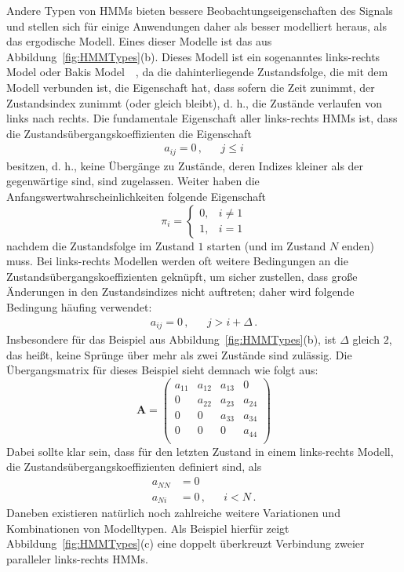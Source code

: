 Andere Typen von \acrshort{HMM}s bieten bessere Beobachtungseigenschaften des Signals und stellen sich f\"ur einige Anwendungen daher als besser modelliert heraus, als das ergodische Modell. Eines dieser Modelle ist das aus  Abbildung~\ref{fig:HMMTypes}(b). Dieses Modell ist ein sogenanntes links-rechts Model oder Bakis Model~\cite{bib:jelinek}~\cite{bib:bakis}, da die dahinterliegende Zustandsfolge, die mit dem Modell verbunden ist, die Eigenschaft hat, dass sofern die Zeit zunimmt, der Zustandsindex zunimmt (oder gleich bleibt), d. h., die Zust\"ande verlaufen von links nach rechts. Die fundamentale Eigenschaft aller links-rechts HMMs ist, dass die Zustands\"ubergangskoeffizienten die Eigenschaft
\begin{align}
a_{ij} = 0 \, , & & j \leq i
\end{align}
besitzen, d. h., keine \"Uberg\"ange zu Zust\"ande, deren Indizes kleiner als der gegenw\"artige sind, sind zugelassen. Weiter haben die Anfangswertwahrscheinlichkeiten folgende Eigenschaft
\[
\pi_i = 
\begin{cases}
	0, & i \ne 1 \\
	1, & i = 1
\end{cases}
\]
nachdem die Zustandsfolge im Zustand $1$ starten (und im Zustand $N$ enden) muss. Bei links-rechts Modellen werden oft weitere Bedingungen an die Zustands\"ubergangskoeffizienten gekn\"upft, um sicher zustellen, dass gro\ss e \"Anderungen in den Zustandsindizes nicht auftreten; daher wird folgende Bedingung h\"aufing verwendet:
\begin{align}
a_{ij} = 0 \, , & & j > i + \varDelta \, .
\end{align}
Insbesondere f\"ur das Beispiel aus Abbildung~\ref{fig:HMMTypes}(b), ist $\varDelta$ gleich $2$, das hei\ss t, keine Spr\"unge \"uber mehr als zwei Zust\"ande sind zul\"assig. Die \"Ubergangsmatrix f\"ur dieses Beispiel sieht demnach wie folgt aus:
\begin{equation}
\mathbf{A} = 
\begin{pmatrix}
a_{11} & a_{12} & a_{13} &0 \\
0 & a_{22} & a_{23} & a_{24} \\
0 & 0 & a_{33} & a_{34} \\
0 & 0 & 0 & a_{44} \\
\end{pmatrix}
\end{equation}
Dabei sollte klar sein, dass f\"ur den letzten Zustand in einem links-rechts Modell, die Zustands\"ubergangskoeffizienten definiert sind, als
\begin{subequations}
\begin{align}
\label{E:TransitionProperties}
a_{NN} &= 0  \\
a_{Ni} &= 0 \, , & & i < N \, . 
\end{align}
\end{subequations}
Daneben existieren nat\"urlich noch zahlreiche weitere Variationen und Kombinationen von Modelltypen. Als Beispiel hierf\"ur zeigt Abbildung~\ref{fig:HMMTypes}(c) eine doppelt \"uberkreuzt Verbindung zweier paralleler links-rechts HMMs.